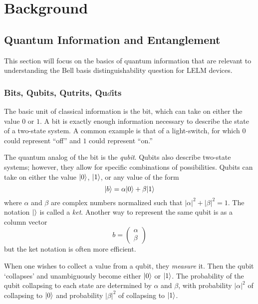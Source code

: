 \chapter{Background}

\section{Quantum Information and Entanglement}

This section will focus on the basics of quantum information that are relevant to understanding the Bell basis distinguishability question for LELM devices.

\subsection{Bits, Qubits, Qutrits, Qu$d$its}


The basic unit of classical information is the bit, which can take on either the value $0$ or $1$. A bit is exactly enough information necessary to describe the state of a two-state system. A common example is that of a light-switch, for which $0$ could represent ``off'' and $1$ could represent ``on.''

The quantum analog of the bit is the \textit{qubit}. Qubits also describe two-state systems; however, they allow for specific combinations of possibilities. Qubits can take on either the value $| 0 \rangle$, $| 1 \rangle$, or any value of the form
\[
| b \rangle = \alpha | 0 \rangle + \beta | 1 \rangle
\]
where $\alpha$ and $\beta$ are complex numbers normalized such that $|\alpha|^2 + |\beta|^2 = 1$. The notation $|  \rangle$ is called a \textit{ket}. Another way to represent the same qubit is as a column vector
\[b = 
\begin{pmatrix}
	\alpha \\
	\beta
\end{pmatrix}
\]
but the ket notation is often more efficient. 

When one wishes to collect a value from a qubit, they \textit{measure} it. Then the qubit `collapses' and unambiguously become either $| 0 \rangle$ or $| 1 \rangle$. The probability of the qubit collapsing to each state are determined by $\alpha$ and $\beta$, with probability $|\alpha|^2$ of collapsing to $| 0 \rangle$ and probability $|\beta|^2$ of collapsing to $| 1 \rangle$.


